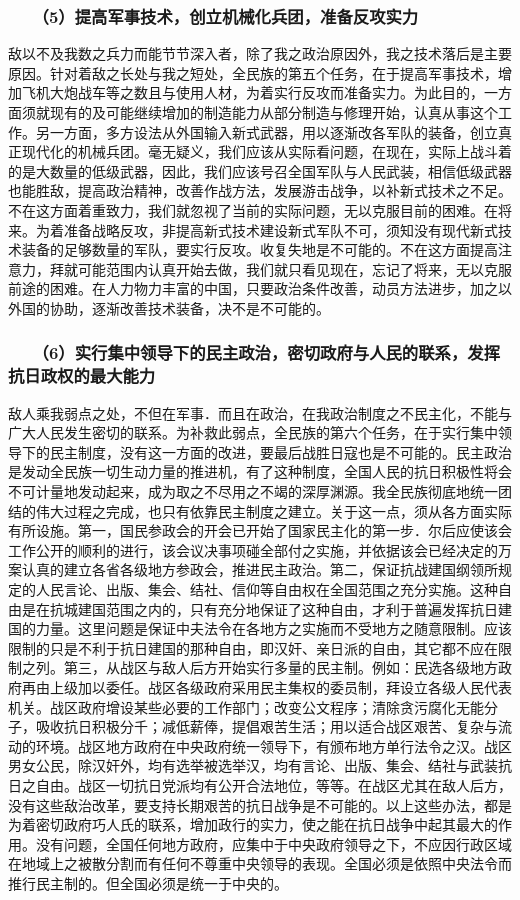 \documentclass[cn,11pt,chinese]{elegantbook}
\def\myformat#1{\hfil\hfil #1}
\begin{document}
\subsubsection*{\myformat{　　（5）提高军事技术，创立机械化兵团，准备反攻实力}}
敌以不及我数之兵力而能节节深入者，除了我之政治原因外，我之技术落后是主要原因。针对着敌之长处与我之短处，全民族的第五个任务，在于提高军事技术，增加飞机大炮战车等之数且与使用人材，为着实行反攻而准备实力。为此目的，一方面须就现有的及可能继续增加的制造能力从部分制造与修理开始，认真从事这个工作。另一方面，多方设法从外国输入新式武器，用以逐渐改各军队的装备，创立真正现代化的机械兵团。毫无疑义，我们应该从实际看问题，在现在，实际上战斗着的是大数量的低级武器，因此，我们应该号召全国军队与人民武装，相信低级武器也能胜敌，提高政治精神，改善作战方法，发展游击战争，以补新式技术之不足。不在这方面着重致力，我们就忽视了当前的实际问题，无以克服目前的困难。在将来。为着准备战略反攻，非提高新式技术建设新式军队不可，须知没有现代新式技术装备的足够数量的军队，要实行反攻。收复失地是不可能的。不在这方面提高注意力，拜就可能范围内认真开始去做，我们就只看见现在，忘记了将来，无以克服前途的困难。在人力物力丰富的中国，只要政治条件改善，动员方法进步，加之以外国的协助，逐渐改善技术装备，决不是不可能的。\\
\subsubsection*{\myformat{　　（6）实行集中领导下的民主政治，密切政府与人民的联系，发挥抗日政权的最大能力}}
敌人乘我弱点之处，不但在军事．而且在政治，在我政治制度之不民主化，不能与广大人民发生密切的联系。为补救此弱点，全民族的第六个任务，在于实行集中领导下的民主制度，没有这一方面的改进，要最后战胜日寇也是不可能的。民主政治是发动全民族一切生动力量的推进机，有了这种制度，全国人民的抗日积极性将会不可计量地发动起来，成为取之不尽用之不竭的深厚渊源。我全民族彻底地统一团结的伟大过程之完成，也只有依靠民主制度之建立。关于这一点，须从各方面实际有所设施。第一，国民参政会的开会已开始了国家民主化的第一步．尔后应使该会工作公开的顺利的进行，该会议决事项碰全部付之实施，并依据该会已经决定的万案认真的建立各省各级地方参政会，推进民主政治。第二，保证抗战建国纲领所规定的人民言论、出版、集会、结社、信仰等自由权在全国范围之充分实施。这种自由是在抗城建国范围之内的，只有充分地保证了这种自由，才利于普遍发挥抗日建国的力量。这里问题是保证中夫法令在各地方之实施而不受地方之随意限制。应该限制的只是不利于抗日建国的那种自由，即汉奸、亲日派的自由，其它都不应在限制之列。第三，从战区与敌人后方开始实行多量的民主制。例如：民选各级地方政府再由上级加以委任。战区各级政府采用民主集权的委员制，拜设立各级人民代表机关。战区政府增设某些必要的工作部门；改变公文程序；清除贪污腐化无能分子，吸收抗日积极分千；减低薪俸，提倡艰苦生活；用以适合战区艰苦、复杂与流动的环境。战区地方政府在中央政府统一领导下，有颁布地方单行法令之汉。战区男女公民，除汉奸外，均有选举被选举汉，均有言论、出版、集会、结社与武装抗日之自由。战区一切抗日党派均有公开合法地位，等等。在战区尤其在敌人后方，没有这些敌治改革，要支持长期艰苦的抗日战争是不可能的。以上这些办法，都是为着密切政府巧人氏的联系，增加政行的实力，使之能在抗日战争中起其最大的作用。没有问题，全国任何地方政府，应集中于中央政府领导之下，不应因行政区域在地域上之被散分割而有任何不尊重中央领导的表现。全国必须是依照中央法令而推行民主制的。但全国必须是统一于中央的。\\
\end{document}
